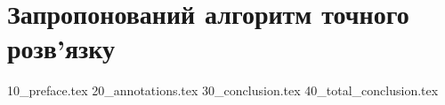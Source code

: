 \chapter{Запропонований алгоритм точного розв'язку}
{10_preface.tex}
{20_annotations.tex}
{30_conclusion.tex}
{40_total_conclusion.tex}
